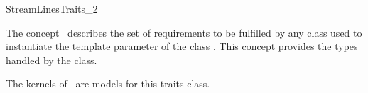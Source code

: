 

\begin{ccRefConcept}{StreamLinesTraits_2}


\ccDefinition
  
The concept \ccRefName\ describes the set of requirements to be
fulfilled by any class used to instantiate the template parameter of the class 
.
This concept provides the types handled by the
 class.

\ccTypes
{}
\ccGlue
{}
\ccGlue
{}
\ccGlue


\ccHasModels
The kernels of \cgal\ are models for this traits class. \\



\end{ccRefConcept}


